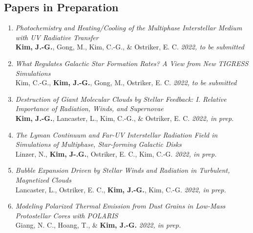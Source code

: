 \subsection{Papers in Preparation}
\begin{enumerate}
\item[] \textit{Photochemistry and Heating/Cooling of the Multiphase
    Interstellar Medium with UV Radiative Transfer} \\ \textbf{Kim, J.-G.},
  Gong, M., Kim, C.-G., \& Ostriker, E. C. \textit{2022, to be submitted}
\item[] \textit{What Regulates Galactic Star Formation Rates? A View from New
    TIGRESS Simulations} \\ Kim, C.-G., \textbf{Kim, J.-G.}, Gong, M., Ostriker,
  E. C. \textit{2022, to be submitted}
\item[] \textit{Destruction of Giant Molecular Clouds by Stellar Feedback: I.
    Relative Importance of Radiation, Winds, and Supernovae} \\ \textbf{Kim,
    J.-G.}, Lancaster, L., Kim, C.-G., \& Ostriker, E. C. \textit{2022, in
    prep.}
\item[] \textit{The Lyman Continuum and Far-UV Interstellar Radiation Field in
    Simulations of Multiphase, Star-forming Galactic Disks} \\ Linzer, N.,
  \textbf{Kim, J-.G.}, Ostriker, E. C., Kim, C.-G. \textit{2022, in prep.}
\item[] \textit{Bubble Expansion Driven by Stellar Winds and Radiation in
    Turbulent, Magnetized Clouds} \\ Lancaster, L., Ostriker, E. C.,
  \textbf{Kim, J.-G.}, Kim, C.-G. \textit{2022, in prep.}
\item[] \textit{Modeling Polarized Thermal Emission from Dust Grains in Low-Mass
    Protostellar Cores with POLARIS} \\ Giang, N. C., Hoang, T., \& \textbf{Kim,
    J.-G.} \textit{2022, in prep.}
\end{enumerate}

